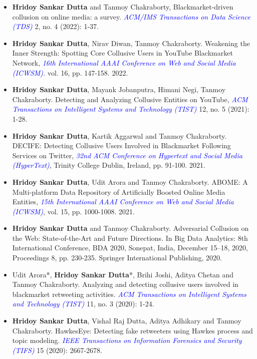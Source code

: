 \documentclass[margin, centered,lmodern]{res}
\begin{document}
\begin{resume}
\begin{itemize}[leftmargin=*]
\item \textbf{Hridoy Sankar Dutta} and Tanmoy Chakraborty, Blackmarket-driven collusion on online media: a survey.  \textit{\textcolor{blue}{ACM/IMS Transactions on Data Science (TDS)}} 2, no. 4 (2022): 1-37.

\item \textbf{Hridoy Sankar Dutta}, Nirav Diwan, Tanmoy Chakraborty. Weakening the Inner Strength: Spotting Core Collusive Users in YouTube Blackmarket Network,  \textit{\textcolor{blue}{16th International AAAI Conference on Web and Social Media (ICWSM)}.}  vol. 16, pp. 147-158. 2022.

\item \textbf{Hridoy Sankar Dutta}, Mayank Jobanputra, Himani Negi, Tanmoy Chakraborty. Detecting and Analyzing Collusive Entities on YouTube,   \textit{\textcolor{blue}{ACM Transactions on Intelligent Systems and Technology (TIST)}} 12, no. 5 (2021): 1-28.

\item \textbf{Hridoy Sankar Dutta}, Kartik Aggarwal and Tanmoy Chakraborty. DECIFE: Detecting Collusive Users Involved in Blackmarket Following Services on Twitter, \textit{\textcolor{blue}{32nd ACM Conference on Hypertext and Social Media (HyperText)}}, Trinity College Dublin, Ireland,  pp. 91-100. 2021.

\item \textbf{Hridoy Sankar Dutta}, Udit Arora and Tanmoy Chakraborty. ABOME: A Multi-platform Data Repository of Artificially Boosted Online Media Entities, \textit{\textcolor{blue}{15th International AAAI Conference on Web and Social Media (ICWSM)}}, vol. 15, pp. 1000-1008. 2021.

\item \textbf{Hridoy Sankar Dutta} and Tanmoy Chakraborty. Adversarial Collusion on the Web: State-of-the-Art and Future Directions. In Big Data Analytics: 8th International Conference, BDA 2020, Sonepat, India, December 15–18, 2020, Proceedings 8, pp. 230-235. Springer International Publishing, 2020.

\item Udit Arora*,  \textbf{Hridoy Sankar Dutta}*,  Brihi Joshi,  Aditya Chetan and Tanmoy Chakraborty.  Analyzing and detecting collusive users involved in blackmarket retweeting activities. \textit{\textcolor{blue}{ACM Transactions on Intelligent Systems and Technology (TIST)}} 11, no. 3 (2020): 1-24.

\item \textbf{Hridoy Sankar Dutta},  Vishal Raj Dutta,  Aditya Adhikary and Tanmoy Chakraborty. HawkesEye: Detecting fake retweeters using Hawkes process and topic modeling. \textit{\textcolor{blue}{IEEE Transactions on Information Forensics and Security (TIFS)}} 15 (2020): 2667-2678.


\end{itemize}
\end{resume}
\end{document}
